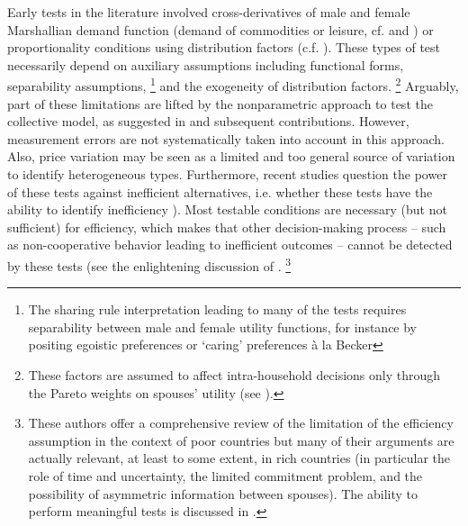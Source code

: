 \medskip
Early tests in the literature involved cross-derivatives of male and female Marshallian demand function (demand of commodities or leisure, cf. \citet{browning1998efficient} and \cite{chiappori1988rational}) or proportionality conditions using distribution factors (c.f. \citet{bourguignon2009efficient}).
These types of test necessarily depend on auxiliary assumptions including functional forms, separability assumptions,
\footnote{The sharing rule interpretation leading to many of the tests requires separability between male and female utility functions, for instance by positing egoistic preferences or `caring’ preferences à la Becker}
and the exogeneity of distribution factors.
\footnote{These factors are assumed to affect intra-household decisions only through the Pareto weights on spouses’ utility (see \citet{bourguignon2009efficient}).}
Arguably, part of these limitations are lifted by the nonparametric approach to test the collective model, as suggested in \citet{cherchye2007collective,cherchye2009opening} and subsequent contributions. However, measurement errors are not systematically taken into account in this approach. Also, price variation may be seen as a limited and too general source of variation to identify heterogeneous types. Furthermore, recent studies question the power of these tests against inefficient alternatives, i.e. whether these tests have the ability to identify inefficiency \citep{naidoo2015power} ). Most testable conditions are necessary (but not sufficient) for efficiency, which makes that other decision-making process – such as non-cooperative behavior leading to inefficient outcomes – cannot be detected by these tests (see the enlightening discussion of \citep{baland2017intra}.
\footnote{These authors offer a comprehensive review of the limitation of the efficiency assumption in the context of poor countries but many of their arguments are actually relevant, at least to some extent, in rich countries (in particular the role of time and uncertainty, the limited commitment problem, and the possibility of asymmetric information between spouses). The ability to perform meaningful tests is discussed in \citet{dauphin2018consumption}.
}


\medskip


